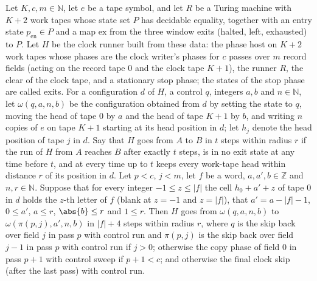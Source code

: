 \begin{lemma}
\label{Turing.cw_seg_back}
\leanok
{}
Let $K,c,m\in\mathbb{N}$, let $e$ be a tape symbol, and let $R$ be a Turing machine with $K+2$
work tapes whose state set $P$ has decidable equality, together with an entry state
$p_{\mathrm{en}}\in P$ and a map $\mathrm{ex}$ from the three window exits (halted, left,
exhausted) to $P$. Let $H$ be the clock runner built from these data: the phase host on $K+2$
work tapes whose phases are the clock writer's phases for $c$ passes over $m$ record fields
(acting on the record tape $0$ and the clock tape $K+1$), the runner $R$, the clear of the
clock tape, and a stationary stop phase; the states of the stop phase are called exits. For a
configuration $d$ of $H$, a control $q$, integers $a,b$ and $n\in\mathbb{N}$, let
$\omega(q,a,n,b)$ be the configuration obtained from $d$ by setting the state to $q$, moving
the head of tape $0$ by $a$ and the head of tape $K+1$ by $b$, and writing $n$ copies of $e$ on
tape $K+1$ starting at its head position in $d$; let $h_j$ denote the head position of tape $j$
in $d$. Say that $H$ goes from $A$ to $B$ in $t$ steps within radius $r$ if the run of $H$ from
$A$ reaches $B$ after exactly $t$ steps, is in no exit state at any time before $t$, and at
every time up to $t$ keeps every work-tape head within distance $r$ of its position in $d$. Let
$p<c$, $j<m$, let $f$ be a word, $a,a',b\in\mathbb{Z}$ and $n,r\in\mathbb{N}$. Suppose that for
every integer $-1\le z\le|f|$ the cell $h_0+a'+z$ of tape $0$ in $d$ holds the $z$-th letter of
$f$ (blank at $z=-1$ and $z=|f|$), that $a'=a-|f|-1$, $0\le a'$, $a\le r$, $\abs{b}\le r$ and
$1\le r$. Then $H$ goes from $\omega(q,a,n,b)$ to $\omega(\pi(p,j),a',n,b)$ in $|f|+4$ steps
within radius $r$, where $q$ is the skip back over field $j$ in pass $p$ with control run and
$\pi(p,j)$ is the skip back over field $j-1$ in pass $p$ with control run if $j>0$; otherwise
the copy phase of field $0$ in pass $p+1$ with control sweep if $p+1<c$; and otherwise the
final clock skip (after the last pass) with control run.
\end{lemma}

